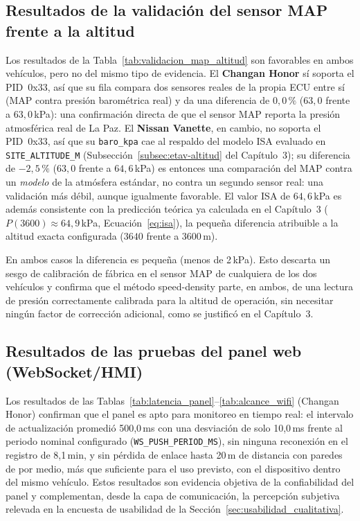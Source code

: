 \subsection{Resultados de la validación del sensor MAP frente a la altitud}

Los resultados de la Tabla~\ref{tab:validacion_map_altitud} son favorables en ambos vehículos, pero no del mismo tipo de evidencia. El \textbf{Changan Honor} sí soporta el PID~0x33, así que su fila compara dos sensores reales de la propia ECU entre sí (MAP contra presión barométrica real) y da una diferencia de $0{,}0\,\%$ ($63{,}0$ frente a $63{,}0$\,kPa): una confirmación directa de que el sensor MAP reporta la presión atmosférica real de La Paz. El \textbf{Nissan Vanette}, en cambio, no soporta el PID~0x33, así que su \texttt{baro\_kpa} cae al respaldo del modelo ISA evaluado en \texttt{SITE\_ALTITUDE\_M} (Subsección~\ref{subsec:etav-altitud} del Capítulo~3); su diferencia de $-2{,}5\,\%$ ($63{,}0$ frente a $64{,}6$\,kPa) es entonces una comparación del MAP contra un \emph{modelo} de la atmósfera estándar, no contra un segundo sensor real: una validación más débil, aunque igualmente favorable. El valor ISA de $64{,}6$\,kPa es además consistente con la predicción teórica ya calculada en el Capítulo~3 ($P(3600)\approx 64{,}9$\,kPa, Ecuación~\eqref{eq:isa}), la pequeña diferencia atribuible a la altitud exacta configurada ($3640$ frente a $3600$\,m).

En ambos casos la diferencia es pequeña (menos de 2\,kPa). Esto descarta un sesgo de calibración de fábrica en el sensor MAP de cualquiera de los dos vehículos y confirma que el método speed-density parte, en ambos, de una lectura de presión correctamente calibrada para la altitud de operación, sin necesitar ningún factor de corrección adicional, como se justificó en el Capítulo~3.

\subsection{Resultados de las pruebas del panel web (WebSocket/HMI)}
\label{sec:resultados_panel_web}

Los resultados de las Tablas~\ref{tab:latencia_panel}--\ref{tab:alcance_wifi} (Changan Honor) confirman que el panel es apto para monitoreo en tiempo real: el intervalo de actualización promedió 500,0\,ms con una desviación de solo 10,0\,ms frente al periodo nominal configurado (\texttt{WS\_PUSH\_PERIOD\_MS}), sin ninguna reconexión en el registro de 8,1\,min, y sin pérdida de enlace hasta 20\,m de distancia con paredes de por medio, más que suficiente para el uso previsto, con el dispositivo dentro del mismo vehículo. Estos resultados son evidencia objetiva de la confiabilidad del panel y complementan, desde la capa de comunicación, la percepción subjetiva relevada en la encuesta de usabilidad de la Sección~\ref{sec:usabilidad_cualitativa}.

